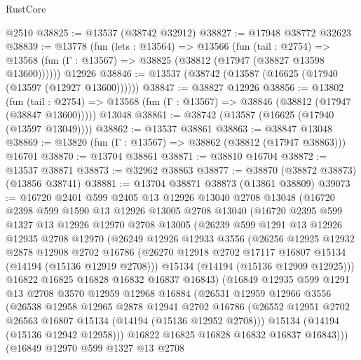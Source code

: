 \begin{lexlean}{RustCore}
\begin{coremodule}
    @2510
@38825 := @13537 (@38742 @32912)
@38827 := @17948 @38772 @32623
@38839 := @13778
    (fun (lets : @13564) =>
    @13566
      (fun (tail : @2754) =>
      @13568 (fun (Γ : @13567) => @38825 (@38812 (@17947 (@38827 @13598 @13600))))))
    @12926
@38846 := @13537 (@38742 (@13587 (@16625 (@17940 (@13597 (@12927 @13600))))))
@38847 := @38827 @12926
@38856 := @13802
    (fun (tail : @2754) => @13568 (fun (Γ : @13567) => @38846 (@38812 (@17947 (@38847 @13600)))))
    @13048
@38861 := @38742 (@13587 (@16625 (@17940 (@13597 @13049))))
@38862 := @13537 @38861
@38863 := @38847 @13048
@38869 := @13820 (fun (Γ : @13567) => @38862 (@38812 (@17947 @38863))) @16701
@38870 := @13704 @38861
@38871 := @38810 @16704
@38872 := @13537 @38871
@38873 := @32962 @38863
@38877 := @38870 (@38872 @38873) (@13856 @38741)
@38881 := @13704 @38871 @38873 (@13861 @38809)
@39073 := @16720
    @2401
    @599
    @2405
    @13
    @12926
    @13040
    @2708
    @13048
    (@16720
      @2398
      @599
      @1590
      @13
      @12926
      @13005
      @2708
      @13040
      (@16720
        @2395
        @599
        @1327
        @13
        @12926
        @12970
        @2708
        @13005
        (@26239
          @599
          @1291
          @13
          @12926
          @12935
          @2708
          @12970
          (@26249
            @12926
            @12933
            @3556
            (@26256
              @12925
              @12932
              @2878
              @12908
              @2702
              @16786
              (@26270 @12918 @2702 @17117 @16807 @15134 (@14194 (@15136 @12919 @2708)))
              @15134
              (@14194 (@15136 @12909 @12925)))
            @16822
            @16825
            @16828
            @16832
            @16837
            @16843)
          (@16849
            @12935
            @599
            @1291
            @13
            @2708
            @3570
            @12959
            @12968
            @16884
            (@26531
              @12959
              @12966
              @3556
              (@26538
                @12958
                @12965
                @2878
                @12941
                @2702
                @16786
                (@26552 @12951 @2702 @26563 @16807 @15134 (@14194 (@15136 @12952 @2708)))
                @15134
                (@14194 (@15136 @12942 @12958)))
              @16822
              @16825
              @16828
              @16832
              @16837
              @16843)))
        (@16849
          @12970
          @599
          @1327
          @13
          @2708

\end{coremodule}
\end{lexlean}
